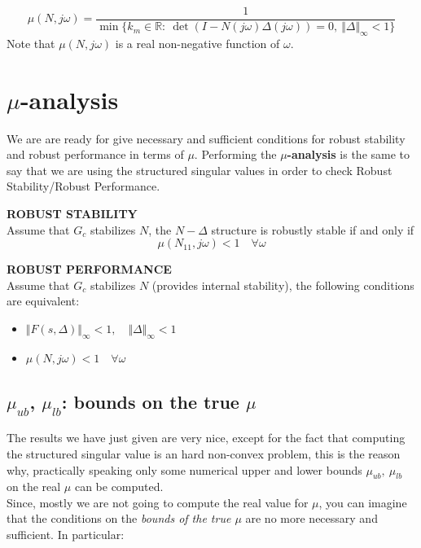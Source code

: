 \documentclass[a4paper, 12pt]{article}
\begin{document}
\begin{equation}
    \mu(N,j\omega)=\frac{1}{\min\{k_m\in\mathbb{R}: \ \det(I-N(j\omega)\Delta(j\omega))=0, \ \Vert \Delta \Vert_\infty < 1\}}
\end{equation}
Note that $\mu(N,j\omega)$ is a real non-negative function of $\omega$. 

\section{$\mu$-analysis}
We are are ready for give necessary and sufficient conditions for robust stability and robust performance in terms of $\mu$. Performing the \textbf{$\mu$-analysis} is the same to say that we are using the structured singular values in order to check Robust Stability/Robust Performance.

\begin{multicols}{2}
    \noindent\textsf{\textbf{ ROBUST STABILITY}}\\
    Assume that $G_c$ stabilizes $N$, the $N-\Delta$ structure is robustly stable if and only if
    \begin{equation}
        \mu(N_{11}, j\omega) < 1 \quad \forall \omega 
    \end{equation}
    
    \newcolumn
    \noindent
    \textsf{\textbf{ROBUST PERFORMANCE}}\\
    Assume that $G_c$ stabilizes $N$ (provides internal stability), the following conditions are equivalent: 
    \begin{itemize}
        \itemsep-0.3em
        \item $\Vert F(s,\Delta) \Vert_\infty < 1, \quad \Vert \Delta \Vert_\infty<1$
        \item $\mu(N,j\omega)<1 \quad \forall \omega$ 
    \end{itemize}
\end{multicols}

\subsection{$\mu_{ub}$, $\mu_{lb}$: bounds on the true $\mu$}
The results we have just given are very nice, except for the fact that computing the structured singular value is an hard non-convex problem, this is the reason why, practically speaking only some numerical upper and lower bounds $\mu_{ub}, \ \mu_{lb}$ on the real $\mu$ can be computed.\\
Since, mostly we are not going to compute the real value for $\mu$, you can imagine that the conditions on the \textit{bounds of the true $\mu$} are no more necessary and sufficient. In particular:
\end{document}
